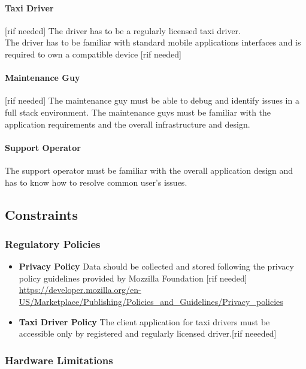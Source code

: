 \documentclass[12pt, a4paper]{article}
\begin{document}
\paragraph{Taxi Driver}\label{par:taxy_driver} [rif needed] The driver has to be a regularly licensed taxi driver.\\ The driver has to be familiar with standard mobile applications interfaces and is required to own a compatible device [rif needed]
\paragraph{Maintenance Guy} \label{par:maintenance_guy}
[rif needed] The maintenance guy must be able to debug and identify issues in a full stack environment. The maintenance guys must be familiar with the application requirements and the overall infrastructure and design.
\paragraph{Support Operator} \label{par:support_operator} The support operator must be familiar with the overall application design and has to know how to resolve common user's issues.

\subsection{Constraints} 
\label{sub:constraints}

\subsubsection{Regulatory Policies} 
\label{ssub:regulatory_policies}
\begin{itemize}
	\item \textbf{Privacy Policy} Data should be collected and stored following the privacy policy guidelines provided by Mozzilla Foundation [rif needed] 	\url{https://developer.mozilla.org/en-US/Marketplace/Publishing/Policies_and_Guidelines/Privacy_policies}
	\item \textbf{Taxi Driver Policy} The client application for taxi drivers must be accessible only by registered and regularly licensed driver.[rif neeeded]
\end{itemize}

\subsubsection{Hardware Limitations} 
\label{ssub:hardware_limitations}
\end{document}
